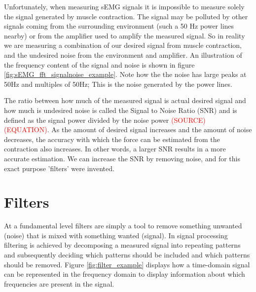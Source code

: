 Unfortunately, when measuring sEMG signals it is impossible to measure solely the signal generated by muscle contraction. The signal may be polluted by other signals coming from the surrounding environment (such a 50 Hz power lines nearby) or from the amplifier used to amplify the measured signal. So in reality we are measuring a combination of our desired signal from muscle contraction, and the undesired noise from the environment and amplifier. An illustration of the frequency content of the signal and noise is shown in figure \ref{fig:sEMG_fft_signalnoise_example}. Note how the the noise has large peaks at 50Hz and multiples of 50Hz; This is the noise generated by the power lines. 

The ratio between how much of the measured signal is actual desired signal and how much is undesired noise is called the Signal to Noise Ratio (SNR) and is defined as the signal power divided by the noise power \textcolor{red}{(SOURCE) (EQUATION)}. As the amount of desired signal increases and the amount of noise decreases, the accuracy with which the force can be estimated from the contraction also increases. In other words, a larger SNR results in a more accurate estimation. We can increase the SNR by removing noise, and for this exact purpose 'filters' were invented.

\section{Filters}
At a fundamental level filters are simply a tool to remove something unwanted (noise) that is mixed with something wanted (signal). In signal processing filtering is achieved by decomposing a measured signal into repeating patterns and subsequently deciding which patterns should be included and which patterns should be removed. Figure \ref{fig:filter_example} displays how a time-domain signal can be represented in the frequency domain to display information about which frequencies are present in the signal.

